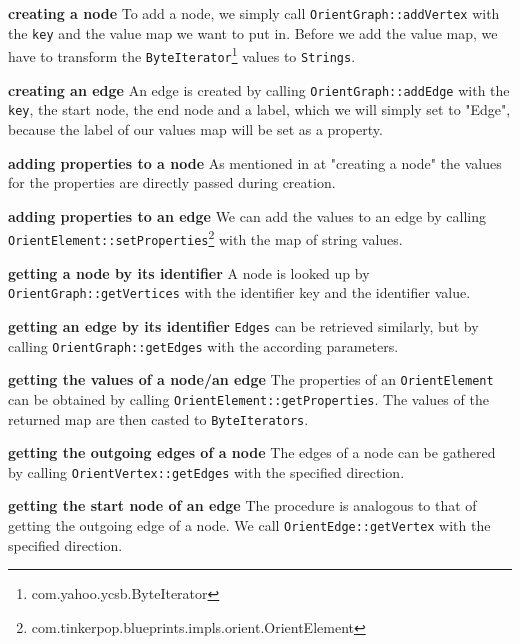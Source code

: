 \textbf{creating a node} \newline
To add a node,
we simply call \texttt{OrientGraph::addVertex} with the \texttt{key} and the value map we want to put in.
Before we add the value map,
we have to transform the \texttt{ByteIterator}\footnote{com.yahoo.ycsb.ByteIterator} values to \texttt{Strings}.

\textbf{creating an edge} \newline
An edge is created by calling \texttt{OrientGraph::addEdge} with the \texttt{key},
the start node,
the end node and a label,
which we will simply set to "Edge",
because the label of our values map will be set as a property.

\textbf{adding properties to a node} \newline
As mentioned in at "creating a node" the values for the properties are directly passed during creation.

\textbf{adding properties to an edge} \newline
We can add the values to an edge by calling \texttt{OrientElement::setProperties}\footnote{com.tinkerpop.blueprints.impls.orient.OrientElement} with the map of string values.

\textbf{getting a node by its identifier} \newline
A node is looked up by \texttt{OrientGraph::getVertices} with the identifier key and the identifier value.

\textbf{getting an edge by its identifier} \newline
\texttt{Edges} can be retrieved similarly,
but by calling \texttt{OrientGraph::getEdges} with the according parameters.

\textbf{getting the values of a node/an edge} \newline
The properties of an \texttt{OrientElement} can be obtained by calling \linebreak
\texttt{OrientElement::getProperties}.
The values of the returned map are then casted to \texttt{ByteIterators}.

\textbf{getting the outgoing edges of a node} \newline
The edges of a node can be gathered by calling \texttt{OrientVertex::getEdges} with the specified direction.

\textbf{getting the start node of an edge} \newline
The procedure is analogous to that of getting the outgoing edge of a node.
We call \texttt{OrientEdge::getVertex} with the specified direction.

